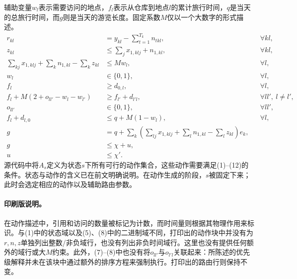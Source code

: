 \documentclass{article}
\begin{document}
辅助变量$w_l$表示需要访问的地点，$f_l$表示从仓库到地点$l$的累计旅行时间，$q$是当天的总旅行时间，而$g$则是当天的游览长度。固定系数$M$仅以一个大数字的形式描述。
\begin{align}
r_{kl}&=y_{kl}-\sum_{t=1}^{T_k}n_{tkl},&&\forall kl,\tag{2}\\
z_{kl}&\leq\sum_jx_{1,klj}+n_{1,kl},&&\forall kl,\tag{3}\\
\sum_{kj}x_{1,klj}+\sum_kn_{1,kl}-\sum_kz_{kl}
&\leq Mw_l,&&\forall l,\tag{4}\\
w_l&\in\{0,1\},&&\forall l,\tag{5}\\
f_l&\geq d_{0,l},&&\forall l,\tag{6}\\
f_l+M(2+o_{ll'}-w_l-w_{l'})
&\geq f_{l'}+d_{l'l},&&\forall ll',\ l\neq l',\tag{7}\\
o_{ll'}&\in\{0,1\},&&\forall ll',\tag{8}\\
f_l+d_{l,0}&\leq q+M(1-w_l),&&\forall l,\tag{9}\\
g&=q+\sum_k\left(\sum_{lj}x_{1,klj}+\sum_ln_{1,kl}-\sum_lz_{kl}\right)e_k,\tag{10}\\
g&\leq\chi+u,\tag{11}\\
u&\leq\chi'.\tag{12}
\end{align}
源代码中将$A_s$定义为状态$s$下所有可行的动作集合，这些动作需要满足(1)--(12)的条件。状态与动作的含义已在前文明确说明。在动作生成的阶段，$s$被固定下来；此时会选定相应的动作以及辅助路由参数。

\paragraph{印刷版说明。}
在动作描述中，引用和访问的数量被标记为计数，而时间量则根据其物理作用来标识。与(1)中的状态域以及(5)、(8)中的二进制域不同，打印出的动作块中并没有为$r,n,z$单独列出整数/非负域行，也没有列出非负时间域行。这里也没有提供任何额外的域行或大$M$约束。此外，(7)--(8)中也没有将$o_{ll'}$与$o_{l'l}$关联起来：所陈述的优先级解释并未在该块中通过额外的排序方程来强制执行。打印出的路由行则保持不变。
\end{document}
